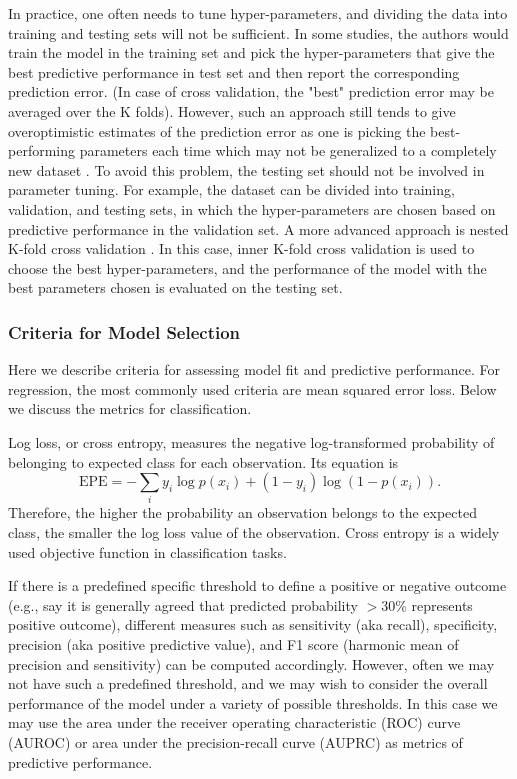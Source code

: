       In practice, one often needs to tune hyper-parameters, and dividing the data into training and testing sets will not be sufficient. In some studies, the authors would train the model in the training set and pick the hyper-parameters that give the best predictive performance in test set and then report the corresponding prediction error. (In case of cross validation, the "best" prediction error may be averaged over the K folds). However, such an approach still tends to give overoptimistic estimates of the prediction error as one is picking the best-performing parameters each time which may not be generalized to a completely new dataset \cite{varma2006bias}. To avoid this problem, the testing set should not be involved in parameter tuning. For example, the dataset can be divided into training, validation, and testing sets, in which the hyper-parameters are chosen based on predictive performance in the validation set. A more advanced approach is nested K-fold cross validation \cite{varma2006bias}. In this case, inner K-fold cross validation is used to choose the best hyper-parameters, and the performance of the model with the best parameters chosen is evaluated on the testing set.

    \subsubsection{Criteria for Model Selection}
      Here we describe criteria for assessing model fit and predictive performance. For regression, the most commonly used criteria are mean squared error loss. Below we discuss the metrics for classification.

      Log loss, or cross entropy, measures the negative log-transformed probability of belonging to expected class for each observation. Its equation is
      \begin{equation}
        \mathrm{EPE} = - \sum_i y_i \log p(x_i) + (1 - y_i) \log (1 - p(x_i)).
      \end{equation}
      Therefore, the higher the probability an observation belongs to the expected class, the smaller the log loss value of the observation. Cross entropy is a widely used objective function in classification tasks.

      If there is a predefined specific threshold to define a positive or negative outcome (e.g., say it is generally agreed that predicted probability $> 30$\% represents positive outcome), different measures such as sensitivity (aka recall), specificity, precision (aka positive predictive value), and F1 score (harmonic mean of precision and sensitivity) can be computed accordingly. However, often we may not have such a predefined threshold, and we may wish to consider the overall performance of the model under a variety of possible thresholds. In this case we may use the area under the receiver operating characteristic (ROC) curve (AUROC) or area under the precision-recall curve (AUPRC) as metrics of predictive performance.
      
